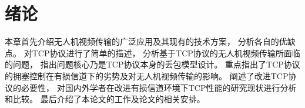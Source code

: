 
\chapter{绪论}
\par
本章首先介绍无人机视频传输的广泛应用及其现有的技术方案，
分析各自的优缺点。
对TCP协议进行了简单的描述，
分析基于TCP协议的无人机视频传输所面临的问题，
指出问题核心乃是TCP协议本身的丢包模型设计。
重点指出了TCP协议的拥塞控制在有损信道下的劣势及对无人机视频传输的影响。
阐述了改进TCP协议的必要性，
对国内外学者在改进有损信道环境下TCP性能的研究现状进行分析和比较。
最后介绍了本论文的工作及论文的相关安排。
